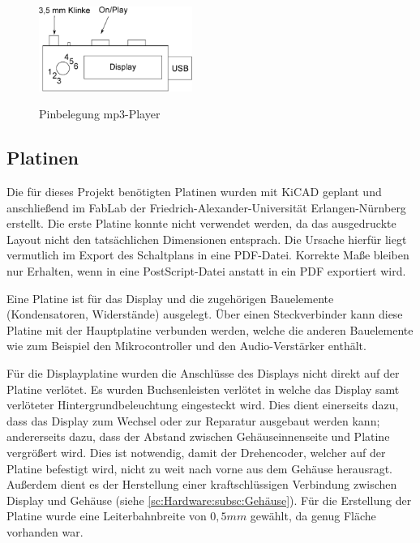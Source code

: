 \documentclass[journal, a4paper]{IEEEtran}
\begin{document}
		\begin{figure}
			\begin{center}
				\label{fig:mp3-Player}
				\includegraphics[width=5cm]{./Grafiken/mp3Player.eps}
				\caption{Pinbelegung mp3-Player}
			\end{center}
		\end{figure}
		
		\subsection{Platinen}
		\label{sc:Hardware:subsc:Platinen}
		Die für dieses Projekt benötigten Platinen wurden mit KiCAD geplant und anschließend im FabLab der Friedrich-Alexander-Universität Erlangen-Nürnberg erstellt. Die erste Platine konnte nicht verwendet werden, da das ausgedruckte Layout nicht den tatsächlichen Dimensionen entsprach. Die Ursache hierfür liegt vermutlich im Export des Schaltplans in eine PDF-Datei. Korrekte Maße bleiben nur Erhalten, wenn in eine PostScript-Datei anstatt in ein PDF exportiert wird.\par Eine Platine ist für das Display und die zugehörigen Bauelemente (Kondensatoren, Widerstände) ausgelegt. Über einen Steckverbinder kann diese Platine mit der Hauptplatine verbunden werden, welche die anderen Bauelemente wie zum Beispiel den Mikrocontroller und den Audio-Verstärker enthält. \par
		Für die Displayplatine wurden die Anschlüsse des Displays nicht direkt auf der Platine verlötet. Es wurden Buchsenleisten verlötet in welche das Display samt verlöteter Hintergrundbeleuchtung eingesteckt wird. Dies dient einerseits dazu, dass das Display zum Wechsel oder zur Reparatur ausgebaut werden kann; andererseits dazu, dass der Abstand zwischen Gehäuseinnenseite und Platine vergrößert wird. Dies ist notwendig, damit der Drehencoder, welcher auf der Platine befestigt wird, nicht zu weit nach vorne aus dem Gehäuse herausragt. Außerdem dient es der Herstellung einer kraftschlüssigen Verbindung zwischen Display und Gehäuse (siehe \ref{sc:Hardware:subsc:Gehäuse}).  Für die Erstellung der Platine wurde eine Leiterbahnbreite von $0,5mm$ gewählt, da genug Fläche vorhanden war.\par
\end{document}
